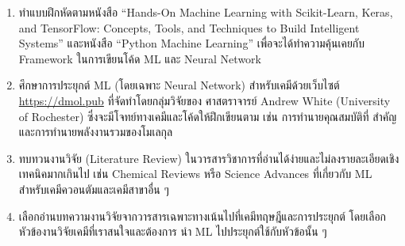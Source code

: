 \begin{enumerate}
    หลังจากนั้นให้เรียนคอร์ส ML โดยคอร์สที่ผมแนะนำคือคอร์สออนไลน์ของศาสตราจารย์ Andrew Ng (Stanford University) บน Coursera 
    โดยมีสองคอร์สหลักคือ 
    \begin{enumerate}
        \item Machine Learning Specialization เป็นคอร์ส ML ที่ได้รับความนิยมมากที่สุดในโลก%
        \footnote{\url{https://www.coursera.org/specializations/machine-learning-introduction}}
        \item Deep Learning Specialization เป็นคอร์สที่ได้รับความนิยมไม่แพ้กัน โดยจะเน้นไปที่ Neural Network%
        \footnote{\url{https://www.coursera.org/specializations/deep-learning}}
    \end{enumerate}

    \noindent และคอร์สของ Stanford University ซึ่งมีศาสตราจารย์ Andrew Ng นำทีมสอนเช่นเดียวกัน
    \begin{enumerate}
        \item CS229: Machine Learning%
        \footnote{\url{https://cs229.stanford.edu}}
        \item CS230: Deep Learning%
        \footnote{\url{https://cs230.stanford.edu}}
    \end{enumerate}
    
    \item ทำแบบฝึกหัดตามหนังสือ \enquote{Hands-On Machine Learning with Scikit-Learn, Keras, and TensorFlow: 
    Concepts, Tools, and Techniques to Build Intelligent Systems} และหนังสือ \enquote{Python Machine Learning} 
    เพื่อจะได้ทำความคุ้นเคยกับ Framework ในการเขียนโค้ด ML และ Neural Network
    
    \item ศึกษาการประยุกต์ ML (โดยเฉพาะ Neural Network) สำหรับเคมีด้วยเว็บไซต์ \url{https://dmol.pub} ที่จัดทำโดยกลุ่มวิจัยของ%
    ศาสตราจารย์ Andrew White (University of Rochester) ซึ่งจะมีโจทย์ทางเคมีและโค้ดให้ฝึกเขียนตาม เช่น การทำนายคุณสมบัติที่%
    สำคัญและการทำนายพลังงานรวมของโมเลกุล
    
    \item ทบทวนงานวิจัย (Literature Review) ในวารสารวิชาการที่อ่านได้ง่ายและไม่ลงรายละเอียดเชิงเทคนิคมากเกินไป เช่น Chemical 
    Reviews หรือ Science Advances ที่เกี่ยวกับ ML สำหรับเคมีควอนตัมและเคมีสาขาอื่น ๆ
    
    \item เลือกอ่านบทความงานวิจัยจากวารสารเฉพาะทางเน้นไปที่เคมีทฤษฎีและการประยุกต์ โดยเลือกหัวข้องานวิจัยเคมีที่เราสนใจและต้องการ%
    นำ ML ไปประยุกต์ใช้กับหัวข้อนั้น ๆ
\end{enumerate}

